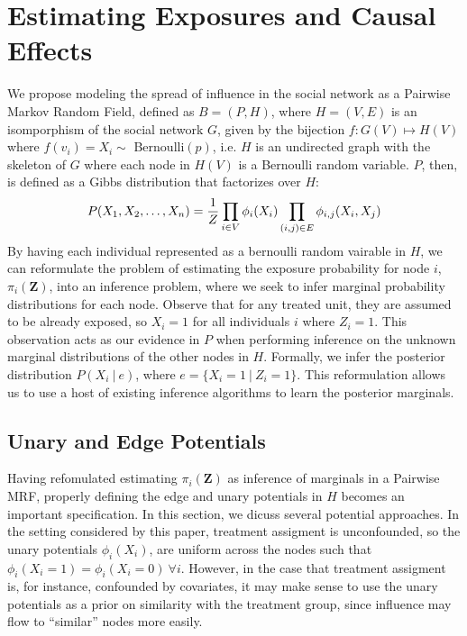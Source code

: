 \documentclass{article}
\begin{document}
\section{Estimating Exposures and Causal Effects}

We propose modeling the spread of influence in the social network as a Pairwise Markov Random Field, defined as $B = (P, H)$, where $H = (V, E)$ is an isomporphism of the social network $G$, given by the bijection $f: G(V) \mapsto H(V)$ where $f(v_i) = X_i \sim $ Bernoulli$(p)$, i.e. $H$ is an undirected graph with the skeleton of $G$ where each node in $H(V)$ is a Bernoulli random variable. 
$P$, then, is defined as a Gibbs distribution that factorizes over $H$: \\
\begin{displaymath}
  P(X_1, X_2, \dots, X_n) = \frac{1}{Z}\prod_{i \in V} \phi_i(X_i)\prod_{(i, j) \in E}\phi_{i,j}(X_i, X_j) \\[0.5ex]
\end{displaymath}
By having each individual represented as a bernoulli random vairable in $H$, we can reformulate the problem of estimating the exposure probability for node $i$,  $\pi_i(\mathbf{Z})$, into 
an inference problem, where we seek to infer marginal probability distributions for each node. Observe that for any treated unit, they are assumed to be already exposed, so $X_i = 1$ for all individuals $i$ where $Z_i = 1$. 
This observation acts as our evidence in $P$ when performing inference on the unknown marginal distributions of the other nodes in $H$. Formally, we infer the posterior distribution $P(X_i\ |\ e)$, where $e = \{X_i = 1\ |\ Z_i = 1\}$. 
This reformulation allows us to use a host of existing inference algorithms to learn the posterior marginals. 





\subsection{Unary and Edge Potentials}

Having refomulated estimating $\pi_i(\mathbf{Z})$ as inference of marginals in a Pairwise MRF, 
properly defining the edge and unary potentials in $H$ becomes an important specification. In this section, 
we dicuss several potential approaches. In the setting considered by this paper, treatment assigment is unconfounded, so 
the unary potentials $\phi_i(X_i)$, are uniform across the nodes such that $\phi_i(X_i = 1) = \phi_i(X_i = 0) \ \forall i$. However, 
in the case that treatment assigment is, for instance, confounded by covariates, it may make sense to use the unary potentials as a prior on similarity 
with the treatment group, since influence may flow to ``similar'' nodes more easily. 
\end{document}

